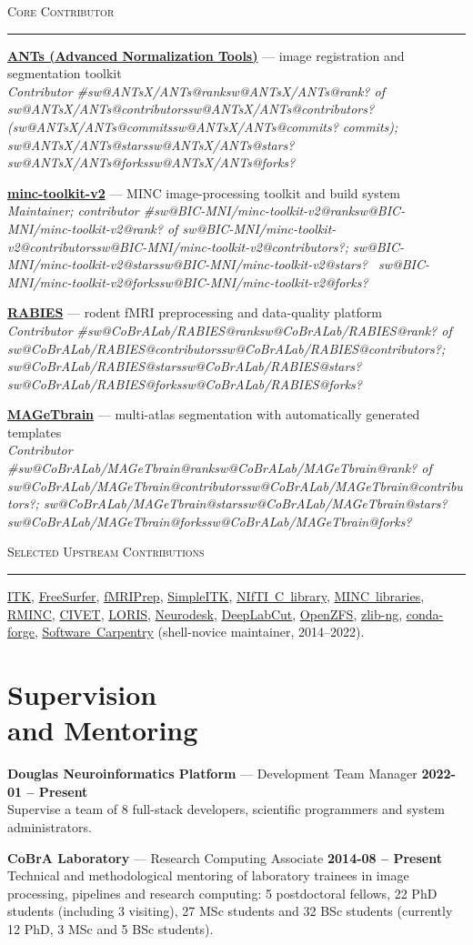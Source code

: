 \documentclass[margin1,line,canadian]{resume}
\makeatletter
\newif\ifshortcv
\newcommand{\swstat}[2]{\ifcsname sw@#1@#2\endcsname\csname sw@#1@#2\endcsname\else ?\fi}
\newcommand{\swgh}[1]{\swstat{#1}{stars}~\faStar{} \swstat{#1}{forks}~\faCodeBranch}
\newcommand{\swgroup}[1]{\par\Needspace{5\baselineskip}\vspace{2mm}%
 \noindent\parbox{\linewidth}{{\large\scshape #1}\\[-0.9ex]\rule{\linewidth}{0.6pt}}\par\nopagebreak}
\newcommand{\swrepo}[4]{\ifshortcv
 \textbf{\href{https://github.com/#1}{\color{black}#2}} --- #3 (\swgh{#1})\par
 \else
 \textbf{\href{https://github.com/#1}{\color{black}#2}} --- #3\\
 \textsl{#4}\par\fi}
\newcommand{\upstream}[2]{\href{https://github.com/search?q=author:gdevenyi+is:pr+is:merged+#1&type=pullrequests}{\mbox{#2}}}
\makeatother
\begin{document}
\begin{resume}
\swgroup{Core Contributor}
\swrepo{ANTsX/ANTs}{ANTs (Advanced Normalization Tools)}%
 {image registration and segmentation toolkit}%
 {Contributor \#\swstat{ANTsX/ANTs}{rank} of \swstat{ANTsX/ANTs}{contributors} (\swstat{ANTsX/ANTs}{commits} commits); \swgh{ANTsX/ANTs}}
\swrepo{BIC-MNI/minc-toolkit-v2}{minc-toolkit-v2}%
 {MINC image-processing toolkit and build system}%
 {Maintainer; contributor \#\swstat{BIC-MNI/minc-toolkit-v2}{rank} of \swstat{BIC-MNI/minc-toolkit-v2}{contributors}; \swgh{BIC-MNI/minc-toolkit-v2}}
\swrepo{CoBrALab/RABIES}{RABIES}%
 {rodent fMRI preprocessing and data-quality platform}%
 {Contributor \#\swstat{CoBrALab/RABIES}{rank} of \swstat{CoBrALab/RABIES}{contributors}; \swgh{CoBrALab/RABIES}}
\swrepo{CoBrALab/MAGeTbrain}{MAGeTbrain}%
 {multi-atlas segmentation with automatically generated templates}%
 {Contributor \#\swstat{CoBrALab/MAGeTbrain}{rank} of \swstat{CoBrALab/MAGeTbrain}{contributors}; \swgh{CoBrALab/MAGeTbrain}}

\swgroup{Selected Upstream Contributions}
\upstream{repo:InsightSoftwareConsortium/ITK}{ITK}, \upstream{repo:freesurfer/freesurfer}{FreeSurfer},
\upstream{repo:nipreps/fmriprep}{fMRIPrep}, \upstream{repo:SimpleITK/SimpleITK}{SimpleITK},
\upstream{repo:NIFTI-Imaging/nifti_clib}{NIfTI C library},
\upstream{org:BIC-MNI+-repo:BIC-MNI/minc-toolkit-v2}{MINC libraries},
\upstream{repo:Mouse-Imaging-Centre/RMINC}{RMINC}, \upstream{repo:aces/CIVET}{CIVET},
\upstream{repo:aces/Loris}{LORIS}, \upstream{org:NeuroDesk}{Neurodesk},
\upstream{repo:DeepLabCut/DeepLabCut}{DeepLabCut}, \upstream{repo:openzfs/zfs}{OpenZFS},
\upstream{repo:zlib-ng/zlib-ng}{zlib-ng}, \upstream{org:conda-forge}{conda-forge},
\upstream{repo:swcarpentry/shell-novice}{Software Carpentry} (shell-novice maintainer, 2014--2022).

 \section{\mysidestyle{}Supervision\\and Mentoring}
 \textbf{Douglas Neuroinformatics Platform} --- Development Team Manager \hfill \textbf{2022-01 -- Present}\\
 Supervise a team of 8 full-stack developers, scientific programmers and system administrators.

 \textbf{CoBrA Laboratory} --- Research Computing Associate \hfill \textbf{2014-08 -- Present}\\
 Technical and methodological mentoring of laboratory trainees in image processing, pipelines and research computing:
 5 postdoctoral fellows, 22 PhD students (including 3 visiting), 27 MSc students and 32 BSc students
 (currently 12 PhD, 3 MSc and 5 BSc students).


\end{resume}
\end{document}

